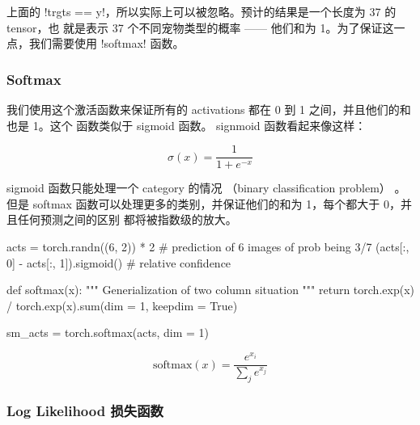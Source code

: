 \documentclass{ctexart}
\newenvironment{monos}{\VerbatimEnvironment\begin{pythoncode}}{\end{pythoncode}}
\begin{document}
上面的 \mono!trgts == y!，所以实际上可以被忽略。预计的结果是一个长度为 37 的 tensor，也
就是表示 37 个不同宠物类型的概率 —— 他们和为 1。为了保证这一点，我们需要使用
\mono!softmax! 函数。

\subsubsection{Softmax}

我们使用这个激活函数来保证所有的 activations 都在 0 到 1 之间，并且他们的和也是 1。这个
函数类似于 sigmoid 函数。 signmoid 函数看起来像这样：

\begin{equation}
    \sigma(x) = \frac{1}{1 + e^{-x}}
\end{equation}


sigmoid 函数只能处理一个 category 的情况 （binary classification problem） 。但是
softmax 函数可以处理更多的类别，并保证他们的和为 1，每个都大于 0，并且任何预测之间的区别
都将被指数级的放大。

\begin{monos}
acts = torch.randn((6, 2)) * 2 # prediction of 6 images of prob being 3/7
(acts[:, 0] - acts[:, 1]).sigmoid() # relative confidence

def softmax(x): 
    """
    Generialization of two column situation
    """
    return torch.exp(x) / torch.exp(x).sum(dim = 1, keepdim = True)

sm_acts = torch.softmax(acts, dim = 1)
\end{monos}


\begin{equation}
    \mathrm{softmax}(x) = \frac{e^{x_i}}{\sum_{j}e^{x_j}}
\end{equation}

\subsubsection{Log Likelihood 损失函数}
\end{document}
